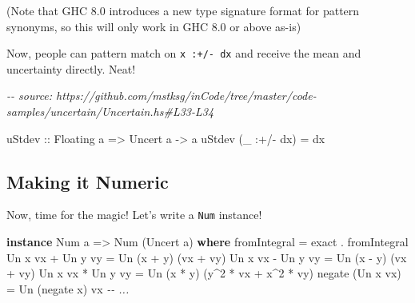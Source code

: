 \documentclass[]{article}
\newenvironment{Shaded}{}{}
\newcommand{\CommentTok}[1]{\textcolor[rgb]{0.38,0.63,0.69}{\textit{#1}}}
\newcommand{\DataTypeTok}[1]{\textcolor[rgb]{0.56,0.13,0.00}{#1}}
\newcommand{\DecValTok}[1]{\textcolor[rgb]{0.25,0.63,0.44}{#1}}
\newcommand{\FunctionTok}[1]{\textcolor[rgb]{0.02,0.16,0.49}{#1}}
\newcommand{\KeywordTok}[1]{\textcolor[rgb]{0.00,0.44,0.13}{\textbf{#1}}}
\newcommand{\NormalTok}[1]{#1}
\newcommand{\OperatorTok}[1]{\textcolor[rgb]{0.40,0.40,0.40}{#1}}
\newcommand{\OtherTok}[1]{\textcolor[rgb]{0.00,0.44,0.13}{#1}}
\begin{document}
(Note that GHC 8.0 introduces a new type signature format for pattern synonyms,
so this will only work in GHC 8.0 or above as-is)

Now, people can pattern match on \texttt{x\ :+/-\ dx} and receive the mean and
uncertainty directly. Neat!

\begin{Shaded}
\begin{Highlighting}[]
\CommentTok{{-}{-} source: https://github.com/mstksg/inCode/tree/master/code{-}samples/uncertain/Uncertain.hs\#L33{-}L34}

\OtherTok{uStdev ::} \DataTypeTok{Floating}\NormalTok{ a }\OtherTok{=>} \DataTypeTok{Uncert}\NormalTok{ a }\OtherTok{{-}>}\NormalTok{ a}
\NormalTok{uStdev (\_ }\OperatorTok{:+/{-}}\NormalTok{ dx) }\OtherTok{=}\NormalTok{ dx}
\end{Highlighting}
\end{Shaded}

\hypertarget{making-it-numeric}{%
\subsection{Making it Numeric}\label{making-it-numeric}}

Now, time for the magic! Let's write a \texttt{Num} instance!

\begin{Shaded}
\begin{Highlighting}[]
\KeywordTok{instance} \DataTypeTok{Num}\NormalTok{ a }\OtherTok{=>} \DataTypeTok{Num}\NormalTok{ (}\DataTypeTok{Uncert}\NormalTok{ a) }\KeywordTok{where}
    \FunctionTok{fromIntegral}      \OtherTok{=}\NormalTok{ exact }\OperatorTok{.} \FunctionTok{fromIntegral}
    \DataTypeTok{Un}\NormalTok{ x vx }\OperatorTok{+} \DataTypeTok{Un}\NormalTok{ y vy }\OtherTok{=} \DataTypeTok{Un}\NormalTok{ (x }\OperatorTok{+}\NormalTok{ y)    (vx }\OperatorTok{+}\NormalTok{ vy)}
    \DataTypeTok{Un}\NormalTok{ x vx }\OperatorTok{{-}} \DataTypeTok{Un}\NormalTok{ y vy }\OtherTok{=} \DataTypeTok{Un}\NormalTok{ (x }\OperatorTok{{-}}\NormalTok{ y)    (vx }\OperatorTok{+}\NormalTok{ vy)}
    \DataTypeTok{Un}\NormalTok{ x vx }\OperatorTok{*} \DataTypeTok{Un}\NormalTok{ y vy }\OtherTok{=} \DataTypeTok{Un}\NormalTok{ (x }\OperatorTok{*}\NormalTok{ y)    (y}\OperatorTok{\^{}}\DecValTok{2} \OperatorTok{*}\NormalTok{ vx }\OperatorTok{+}\NormalTok{ x}\OperatorTok{\^{}}\DecValTok{2} \OperatorTok{*}\NormalTok{ vy)}
    \FunctionTok{negate}\NormalTok{ (}\DataTypeTok{Un}\NormalTok{ x vx)  }\OtherTok{=} \DataTypeTok{Un}\NormalTok{ (}\FunctionTok{negate}\NormalTok{ x) vx}
    \CommentTok{{-}{-} ...}
\end{Highlighting}
\end{Shaded}
\end{document}
